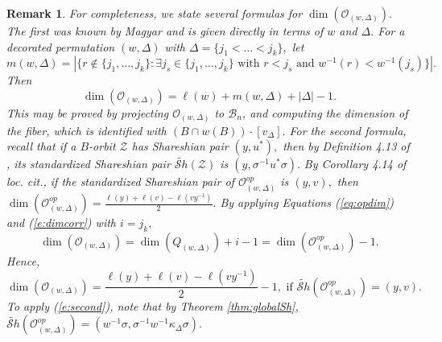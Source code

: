 \documentclass[12pt]{amsart}
\numberwithin{equation}{section}
\newtheorem{rem}[thm]{Remark}
\newcommand{\cZ}{{\mathcal Z}}
\newcommand{\B}{\mathcal{B}}
\newcommand{\Sh}{\mathcal{S}h}
\begin{document}
\begin{rem} For completeness, we state several formulas for $\dim(\mathcal{O}_{(w,\Delta)}).$  The first was known by Magyar and is given directly in terms of $w$ and $\Delta.$   For a decorated permutation $(w,\Delta)$ with $\Delta = \{ j_1 < \dots < j_k\},$ let 
\[
m(w,\Delta)=|\{ r \not\in \{j_1, \dots, j_k \} : \exists j_s \in \{ j_1, \dots, j_k \} \mbox { with } r < j_s \mbox{ and } w^{-1}(r) < w^{-1}(j_s)\}|.
\]
Then 
\begin{equation} \label{e:dimfirst}
\dim(\mathcal{O}_{(w,\Delta)})=\ell(w)+m(w,\Delta) + |\Delta| - 1.
\end{equation}
This may be proved by projecting $\mathcal{O}_{(w,\Delta)}$ to $\B_n$, and computing the dimension of the fiber, which is identified with $(B\cap w(B))\cdot [v_{\Delta}].$ For the second formula, recall that if a $B$-orbit ${\cZ}$ has Shareshian pair $(y,u^{*}),$ then by Definition 4.13 of \cite{Shpairs}, its standardized Shareshian pair $\widetilde{\Sh}(\cZ)$ is $(y,\sigma^{-1}u^{*}\sigma).$  By Corollary 4.14 of loc. cit., if the standardized Shareshian pair of  $\mathcal{O}_{(w,\Delta)}^{op}$ is $(y,v),$ then $\dim(\mathcal{O}_{(w,\Delta)}^{op})=\frac{\ell(y)+\ell(v)-\ell(vy^{-1})}{2}.$  By applying Equations (\ref{eq:opdim}) and (\ref{e:dimcorr}) with $i=j_k,$
\[
\dim(\mathcal{O}_{(w,\Delta)})=\dim(Q_{(w,\Delta)})+i-1=\dim(\mathcal{O}_{(w,\Delta)}^{op})-1.
\]
Hence,
\begin{equation}\label{e:second}
\dim(\mathcal{O}_{(w,\Delta)})=\frac{\ell(y)+\ell(v)-\ell(vy^{-1})}{2} - 1, \mbox{ if } \widetilde{\Sh}(\mathcal{O}_{(w,\Delta)}^{op})=(y,v).
\end{equation}
To apply (\ref{e:second}), note that by Theorem \ref{thm:globalSh}, $\widetilde{\Sh}(\mathcal{O}_{(w,\Delta)}^{op})=(w^{-1}\sigma, \sigma^{-1}w^{-1}\kappa_{\Delta}\sigma).$
\end{rem}
\end{document}
